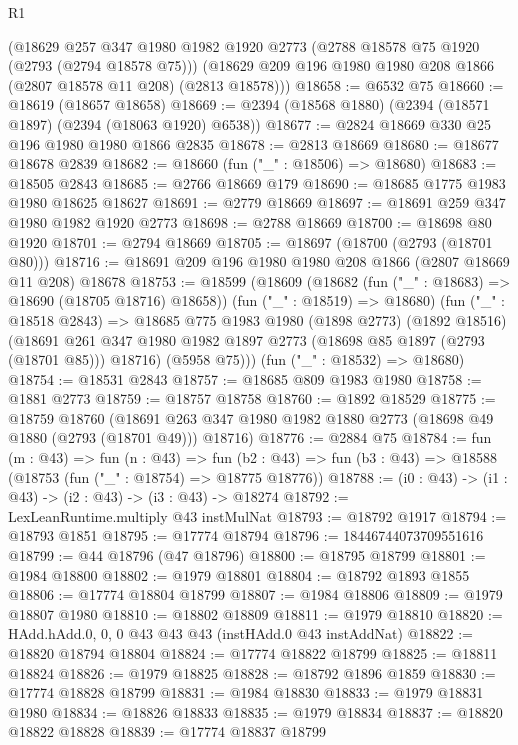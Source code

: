 \begin{lexlean}{R1}
\begin{coremodule}
    (@18629
      @257
      @347
      @1980
      @1982
      @1920
      @2773
      (@2788 @18578 @75 @1920 (@2793 (@2794 @18578 @75)))
      (@18629 @209 @196 @1980 @1980 @208 @1866 (@2807 @18578 @11 @208) (@2813 @18578)))
@18658 := @6532 @75
@18660 := @18619 (@18657 @18658)
@18669 := @2394 (@18568 @1880) (@2394 (@18571 @1897) (@2394 (@18063 @1920) @6538))
@18677 := @2824 @18669 @330 @25 @196 @1980 @1980 @1866 @2835
@18678 := @2813 @18669
@18680 := @18677 @18678 @2839
@18682 := @18660 (fun ("_" : @18506) => @18680)
@18683 := @18505 @2843
@18685 := @2766 @18669 @179
@18690 := @18685 @1775 @1983 @1980 @18625 @18627
@18691 := @2779 @18669
@18697 := @18691 @259 @347 @1980 @1982 @1920 @2773
@18698 := @2788 @18669
@18700 := @18698 @80 @1920
@18701 := @2794 @18669
@18705 := @18697 (@18700 (@2793 (@18701 @80)))
@18716 := @18691 @209 @196 @1980 @1980 @208 @1866 (@2807 @18669 @11 @208) @18678
@18753 := @18599
    (@18609
      (@18682 (fun ("_" : @18683) => @18690 (@18705 @18716) @18658))
      (fun ("_" : @18519) => @18680)
      (fun ("_" : @18518 @2843) =>
      @18685
        @775
        @1983
        @1980
        (@1898 @2773)
        (@1892 @18516)
        (@18691 @261 @347 @1980 @1982 @1897 @2773 (@18698 @85 @1897 (@2793 (@18701 @85))) @18716)
        (@5958 @75)))
    (fun ("_" : @18532) => @18680)
@18754 := @18531 @2843
@18757 := @18685 @809 @1983 @1980
@18758 := @1881 @2773
@18759 := @18757 @18758
@18760 := @1892 @18529
@18775 := @18759
    @18760
    (@18691 @263 @347 @1980 @1982 @1880 @2773 (@18698 @49 @1880 (@2793 (@18701 @49))) @18716)
@18776 := @2884 @75
@18784 := fun (m : @43) =>
  fun (n : @43) =>
  fun (b2 : @43) => fun (b3 : @43) => @18588 (@18753 (fun ("_" : @18754) => @18775 @18776))
@18788 := (i0 : @43) -> (i1 : @43) -> (i2 : @43) -> (i3 : @43) -> @18274
@18792 := LexLeanRuntime.multiply @43 instMulNat
@18793 := @18792 @1917
@18794 := @18793 @1851
@18795 := @17774 @18794
@18796 := 18446744073709551616
@18799 := @44 @18796 (@47 @18796)
@18800 := @18795 @18799
@18801 := @1984 @18800
@18802 := @1979 @18801
@18804 := @18792 @1893 @1855
@18806 := @17774 @18804 @18799
@18807 := @1984 @18806
@18809 := @1979 @18807 @1980
@18810 := @18802 @18809
@18811 := @1979 @18810
@18820 := HAdd.hAdd.{0, 0, 0} @43 @43 @43 (instHAdd.{0} @43 instAddNat)
@18822 := @18820 @18794 @18804
@18824 := @17774 @18822 @18799
@18825 := @18811 @18824
@18826 := @1979 @18825
@18828 := @18792 @1896 @1859
@18830 := @17774 @18828 @18799
@18831 := @1984 @18830
@18833 := @1979 @18831 @1980
@18834 := @18826 @18833
@18835 := @1979 @18834
@18837 := @18820 @18822 @18828
@18839 := @17774 @18837 @18799

\end{coremodule}
\end{lexlean}
